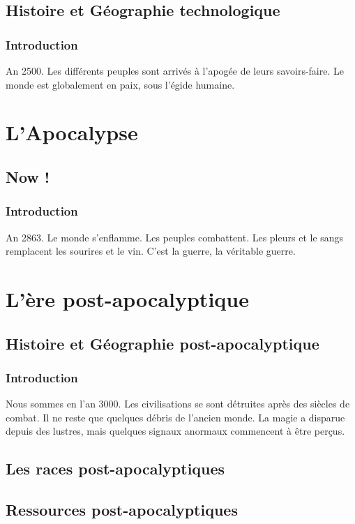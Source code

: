 \documentclass{book}
\begin{document}
\chapter{Histoire et Géographie technologique}
\section{Introduction}
An 2500. Les différents peuples sont arrivés à l'apogée de leurs savoirs-faire. Le monde est globalement en paix, sous l'égide humaine.


\part{L'Apocalypse}
\chapter{Now !}
\section{Introduction}
An 2863. Le monde s'enflamme. Les peuples combattent. Les pleurs et le sangs remplacent les sourires et le vin. C'est la guerre, la véritable guerre.


\part{L'ère post-apocalyptique}
\chapter{Histoire et Géographie post-apocalyptique}
\section{Introduction}
Nous sommes en l'an 3000. Les civilisations se sont détruites après des siècles de combat. 
Il ne reste que quelques débris de l'ancien monde. 
La magie a disparue depuis des lustres, mais quelques signaux anormaux commencent à être perçus.


\chapter{Les races post-apocalyptiques}



\chapter{Ressources post-apocalyptiques}

\end{document}
